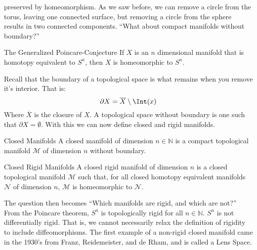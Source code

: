 \documentclass[crop=false,class=book,oneside]{standalone}
\begin{document}
            preserved by homeomorphism. As we saw before, we
            can remove a circle from the torus, leaving one connected
            surface, but removing a circle from the sphere results in
            two connected components.
            ``What about compact manifolds without boundary?''
            \begin{ltheorem}{The Generalized Poincare-Conjecture}
                If $X$ is an $n$ dimensional manifold that
                is homotopy equivalent to $S^{n}$, then $X$
                is homeomorphic to $S^{n}$.
            \end{ltheorem}
            \vspace{5pt}
            Recall that the boundary of a topological space
            is what remains when you remove it's interior.
            That is:
            \begin{equation}
                \partial{X}=\overline{X}\setminus\Int(x)
            \end{equation}
            Where $\overline{X}$ is the closure of $X$.
            A topological space without boundary is one such that
            $\partial{X}=\emptyset$. With this we can now define
            closed and rigid manifolds.
            \begin{ldefinition}{Closed Manifolds}
                A closed manifold of dimension $n\in\mathbb{N}$ is
                a compact topological manifold $\mathcal{M}$ of
                dimension $n$ without boundary.
            \end{ldefinition}
            \begin{ldefinition}{Closed Rigid Manifolds}
                A closed rigid manifold of dimension $n$
                is a closed topological manifold $\mathcal{M}$
                such that, for all closed homotopy equivalent
                manifolds $\mathcal{N}$ of dimension $n$,
                $\mathcal{M}$ is homeomorphic to $\mathcal{N}$.
            \end{ldefinition}
            The question then becomes
            ``Which manifolds are rigid, and which are not?''
            From the Poincare theorem, $S^{n}$ is topologically
            rigid for all $n\in\mathbb{N}$. $S^{n}$ is not differentially
            rigid. That is, we cannot necessarily relax the definition
            of rigidity to include diffeomorphisms.
            The first example of a non-rigid closed
            manifold came in the 1930's from Franz, Reidemeister,
            and de Rham, and is called a Lens Space.
\end{document}
